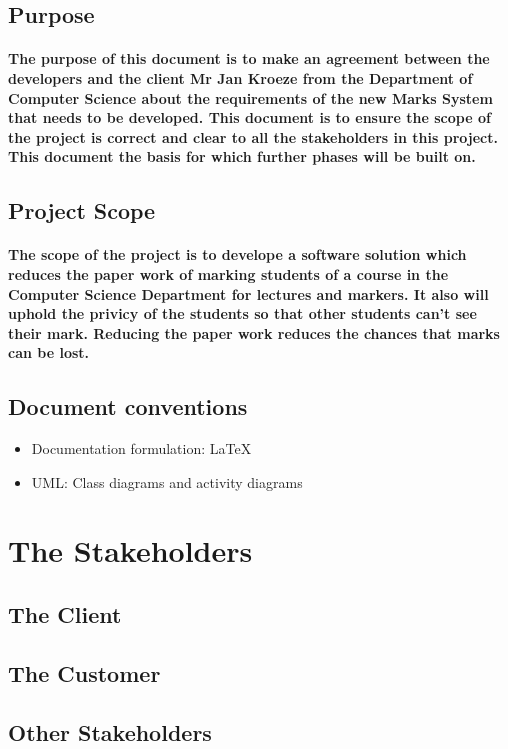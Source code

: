\documentclass[12pt,a4paper]{article}
\begin{document}
\subsection{Purpose}
\paragraph{The purpose of this document is to make an agreement between the developers and the client Mr Jan Kroeze from the Department of Computer Science about the requirements of the new Marks System that needs to be developed. This document is to ensure the scope of the project is correct and clear to all the stakeholders in this project. This document the basis for which further phases will be built on.}
\subsection{Project Scope}
\paragraph{The scope of the project is to develope a software solution which reduces the paper work of marking students of a course in the Computer Science Department for lectures and markers. It also will uphold the privicy of the students so that other students can't see their mark. Reducing the paper work reduces the chances that marks can be lost.}
\subsection{Document conventions}
\begin{itemize}
\item Documentation formulation: LaTeX
\item UML: Class diagrams and activity diagrams
\end{itemize}
\pagebreak
\section{The Stakeholders}
\subsection{The Client}
\subsection{The Customer}
\subsection{Other Stakeholders}
\end{document}
